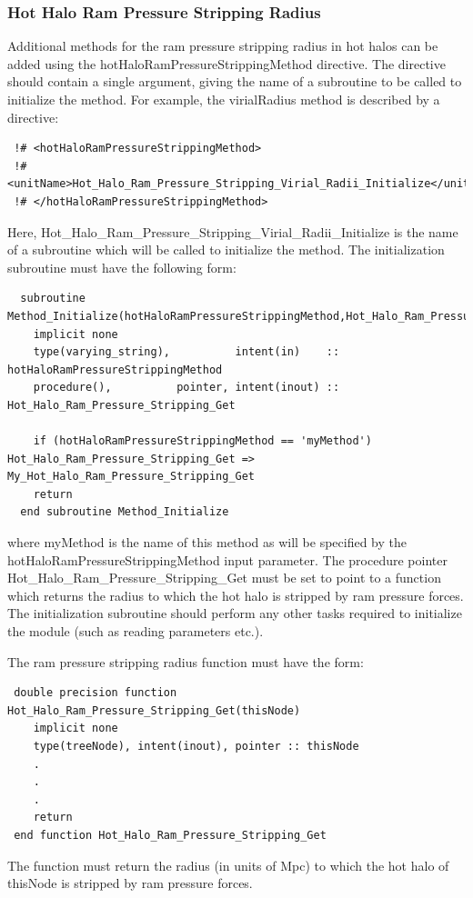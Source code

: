 \subsubsection{Hot Halo Ram Pressure Stripping Radius}

Additional methods for the ram pressure stripping radius in hot halos can be added using the {\normalfont \ttfamily hotHaloRamPressureStrippingMethod} directive. The directive should contain a single argument, giving the name of a subroutine to be called to initialize the method. For example, the {\normalfont \ttfamily virialRadius} method is described by a directive:
\begin{verbatim}
 !# <hotHaloRamPressureStrippingMethod>
 !#  <unitName>Hot_Halo_Ram_Pressure_Stripping_Virial_Radii_Initialize</unitName>
 !# </hotHaloRamPressureStrippingMethod>
\end{verbatim}
Here, {\normalfont \ttfamily Hot\_Halo\_Ram\_Pressure\_Stripping\_Virial\_Radii\_Initialize} is the name of a subroutine which will be called to initialize the method. The initialization subroutine must have the following form:
\begin{verbatim}
  subroutine Method_Initialize(hotHaloRamPressureStrippingMethod,Hot_Halo_Ram_Pressure_Stripping_Get)
    implicit none
    type(varying_string),          intent(in)    :: hotHaloRamPressureStrippingMethod
    procedure(),          pointer, intent(inout) :: Hot_Halo_Ram_Pressure_Stripping_Get
    
    if (hotHaloRamPressureStrippingMethod == 'myMethod') Hot_Halo_Ram_Pressure_Stripping_Get => My_Hot_Halo_Ram_Pressure_Stripping_Get
    return
  end subroutine Method_Initialize
\end{verbatim}
where {\normalfont \ttfamily myMethod} is the name of this method as will be specified by the {\normalfont \ttfamily hotHaloRamPressureStrippingMethod} input parameter. The procedure pointer {\normalfont \ttfamily Hot\_Halo\_Ram\_Pressure\_Stripping\_Get} must be set to point to a function which returns the radius to which the hot halo is stripped by ram pressure forces. The initialization subroutine should perform any other tasks required to initialize the module (such as reading parameters etc.).

The ram pressure stripping radius function must have the form:
\begin{verbatim}
 double precision function Hot_Halo_Ram_Pressure_Stripping_Get(thisNode)
    implicit none
    type(treeNode), intent(inout), pointer :: thisNode
    .
    .
    .
    return
 end function Hot_Halo_Ram_Pressure_Stripping_Get
\end{verbatim}
The function must return the radius (in units of Mpc) to which the hot halo of {\normalfont \ttfamily thisNode} is stripped by ram pressure forces.

